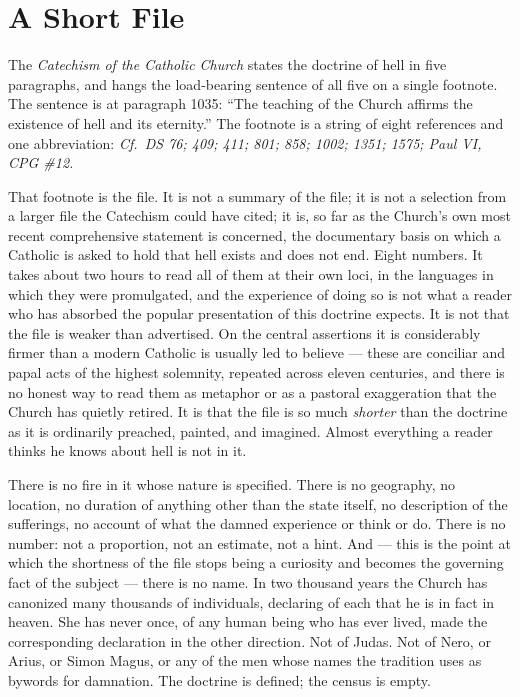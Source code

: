 \section{A Short File}

The \emph{Catechism of the Catholic Church} states the doctrine of hell in five paragraphs, and hangs the load-bearing sentence of all five on a single footnote. The sentence is at paragraph 1035: ``The teaching of the Church affirms the existence of hell and its eternity.'' The footnote is a string of eight references and one abbreviation: \emph{Cf.\ DS 76; 409; 411; 801; 858; 1002; 1351; 1575; Paul VI, CPG \#12.}

That footnote is the file. It is not a summary of the file; it is not a selection from a larger file the Catechism could have cited; it is, so far as the Church's own most recent comprehensive statement is concerned, the documentary basis on which a Catholic is asked to hold that hell exists and does not end. Eight numbers. It takes about two hours to read all of them at their own loci, in the languages in which they were promulgated, and the experience of doing so is not what a reader who has absorbed the popular presentation of this doctrine expects. It is not that the file is weaker than advertised. On the central assertions it is considerably firmer than a modern Catholic is usually led to believe --- these are conciliar and papal acts of the highest solemnity, repeated across eleven centuries, and there is no honest way to read them as metaphor or as a pastoral exaggeration that the Church has quietly retired. It is that the file is so much \emph{shorter} than the doctrine as it is ordinarily preached, painted, and imagined. Almost everything a reader thinks he knows about hell is not in it.

There is no fire in it whose nature is specified. There is no geography, no location, no duration of anything other than the state itself, no description of the sufferings, no account of what the damned experience or think or do. There is no number: not a proportion, not an estimate, not a hint. And --- this is the point at which the shortness of the file stops being a curiosity and becomes the governing fact of the subject --- there is no name. In two thousand years the Church has canonized many thousands of individuals, declaring of each that he is in fact in heaven. She has never once, of any human being who has ever lived, made the corresponding declaration in the other direction. Not of Judas. Not of Nero, or Arius, or Simon Magus, or any of the men whose names the tradition uses as bywords for damnation. The doctrine is defined; the census is empty.

